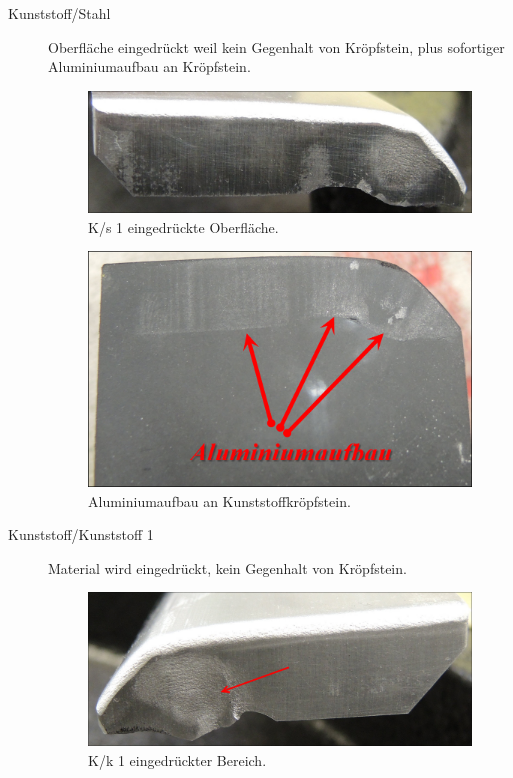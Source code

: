 \documentclass[12pt,a4paper,parskip,twoside,BCOR5mm,headsepline]{scrartcl}
\begin{document}
\begin{description*}
\begin{description}
\item[Kunststoff/Stahl] Oberfläche eingedrückt weil kein Gegenhalt von Kröpfstein, plus sofortiger Aluminiumaufbau an Kröpfstein.
\begin{figure}[H]
\centering
\includegraphics[width=.8\textwidth]{Ks1}
\caption{K/s 1 eingedrückte Oberfläche.}
\label{fig:Ks1}
\end{figure}
\begin{figure}[H]
\centering
\includegraphics[width=.8\textwidth]{SteinKAlubau}
\caption{Aluminiumaufbau an Kunststoffkröpfstein.}
\label{fig:SteinKAlubau}
\end{figure}
\newpage

\item[Kunststoff/Kunststoff 1] Material wird eingedrückt, kein Gegenhalt von Kröpfstein.
\begin{figure}[H]
\centering
\includegraphics[width=.8\textwidth]{Kk1a}
\caption{K/k 1 eingedrückter Bereich.}
\label{fig:Kk}
\end{figure}



\end{description}
\end{description*}
\end{document}

